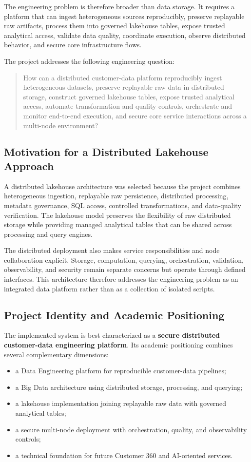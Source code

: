 The engineering problem is therefore broader than data storage. It requires a platform that can ingest heterogeneous sources reproducibly, preserve replayable raw artifacts, process them into governed lakehouse tables, expose trusted analytical access, validate data quality, coordinate execution, observe distributed behavior, and secure core infrastructure flows.

The project addresses the following engineering question:

\begin{quote}
How can a distributed customer-data platform reproducibly ingest heterogeneous datasets, preserve replayable raw data in distributed storage, construct governed lakehouse tables, expose trusted analytical access, automate transformation and quality controls, orchestrate and monitor end-to-end execution, and secure core service interactions across a multi-node environment?
\end{quote}

\subsection{Motivation for a Distributed Lakehouse Approach}
A distributed lakehouse architecture was selected because the project combines heterogeneous ingestion, replayable raw persistence, distributed processing, metadata governance, SQL access, controlled transformations, and data-quality verification. The lakehouse model preserves the flexibility of raw distributed storage while providing managed analytical tables that can be shared across processing and query engines.

The distributed deployment also makes service responsibilities and node collaboration explicit. Storage, computation, querying, orchestration, validation, observability, and security remain separate concerns but operate through defined interfaces. This architecture therefore addresses the engineering problem as an integrated data platform rather than as a collection of isolated scripts.

\subsection{Project Identity and Academic Positioning}
The implemented system is best characterized as a \textbf{secure distributed customer-data engineering platform}. Its academic positioning combines several complementary dimensions:

\begin{itemize}
    \item a Data Engineering platform for reproducible customer-data pipelines;
    \item a Big Data architecture using distributed storage, processing, and querying;
    \item a lakehouse implementation joining replayable raw data with governed analytical tables;
    \item a secure multi-node deployment with orchestration, quality, and observability controls;
    \item a technical foundation for future Customer 360 and AI-oriented services.
\end{itemize}

